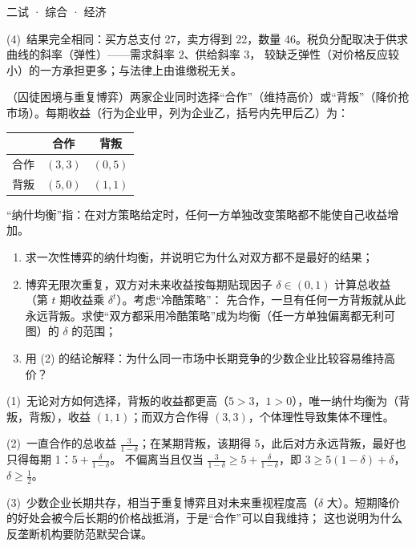 \documentclass[cjk=noto, seal=first]{mojing-exam}
\begin{document}
\begin{paper}[time={建议 1.5 小时（训练设置）}, full=100]{二试 · 综合 · 经济}
\begin{questions}
\begin{solution}
(4)~结果完全相同：买方总支付 27，卖方得到 22，数量 46。税负分配取决于供求曲线的斜率（弹性）——需求斜率 $2$、供给斜率 $3$，
较缺乏弹性（对价格反应较小）的一方承担更多；与法律上由谁缴税无关。
\end{solution}

\question[25]
（囚徒困境与重复博弈）两家企业同时选择“合作”（维持高价）或“背叛”（降价抢市场）。每期收益（行为企业甲，列为企业乙，括号内先甲后乙）为：
\begin{center}
\begin{tabular}{c|cc}
  \toprule
  & 合作 & 背叛 \\
  \midrule
  合作 & $(3,3)$ & $(0,5)$ \\
  背叛 & $(5,0)$ & $(1,1)$ \\
  \bottomrule
\end{tabular}
\end{center}
“纳什均衡”指：在对方策略给定时，任何一方单独改变策略都不能使自己收益增加。
\begin{enumerate}
  \item 求一次性博弈的纳什均衡，并说明它为什么对双方都不是最好的结果；
  \item 博弈无限次重复，双方对未来收益按每期贴现因子 $\delta\in(0,1)$ 计算总收益（第 $t$ 期收益乘 $\delta^{t}$）。考虑“冷酷策略”：
        先合作，一旦有任何一方背叛就从此永远背叛。求使“双方都采用冷酷策略”成为均衡（任一方单独偏离都无利可图）的 $\delta$ 的范围；
  \item 用 (2) 的结论解释：为什么同一市场中长期竞争的少数企业比较容易维持高价？
\end{enumerate}
\answerspace{2cm}
\begin{solution}
(1)~无论对方如何选择，背叛的收益都更高（$5>3$，$1>0$），唯一纳什均衡为（背叛，背叛），收益 $(1,1)$；而双方合作得 $(3,3)$，个体理性导致集体不理性。

(2)~一直合作的总收益 $\frac{3}{1-\delta}$；在某期背叛，该期得 5，此后对方永远背叛，最好也只得每期 1：$5+\frac{\delta}{1-\delta}$。
不偏离当且仅当 $\frac3{1-\delta}\ge5+\frac{\delta}{1-\delta}$，即 $3\ge5(1-\delta)+\delta$，$\delta\ge\frac12$。

(3)~少数企业长期共存，相当于重复博弈且对未来重视程度高（$\delta$ 大）。短期降价的好处会被今后长期的价格战抵消，于是“合作”可以自我维持；
这也说明为什么反垄断机构要防范默契合谋。
\end{solution}


\end{questions}
\end{paper}
\end{document}

